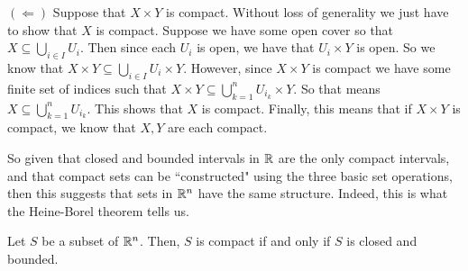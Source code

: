 \begin{pf}[source=Kirat]
    $ (\Longleftarrow) $ Suppose that $X\times Y$ is compact. Without loss of generality we just
    have to show that $X$ is compact. Suppose we have some open cover so that $X\subseteq
    \bigcup_{i\in I} U_i$. Then since each $U_i$ is open, we have that $U_i\times Y$ is open. So we
    know that $X\times Y \subseteq\bigcup_{i\in I} U_i \times Y$. However, since $X\times Y$ is
    compact we have some finite set of indices such that $X\times Y \subseteq\bigcup_{k=1}^n
    U_{i_k} \times Y$. So that means $X\subseteq \bigcup_{k=1}^n U_{i_k}$. This shows that $X$ is
    compact. Finally, this means that if $X\times Y$ is compact, we know that $X,Y$ are each
    compact.
\end{pf}

So given that closed and bounded intervals in $ \mathbb{R} $ are the only compact intervals, and that
compact sets can be ``constructed" using the three basic set operations, then this suggests that
sets in $ \mathbb{R}^{n} $ have the same structure. Indeed, this is what the Heine-Borel theorem tells
us.

\begin{thm}[title=Heine-Borel Theorem]
    Let $ S $ be a subset of $ \mathbb{R}^{n} $. Then, $ S $ is compact if and only if $ S $ is
    closed and bounded.
\end{thm}

